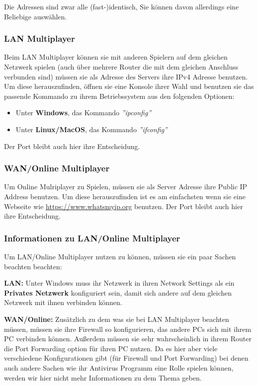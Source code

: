 \documentclass[fontsize=12pt,paper=a4,twoside]{scrartcl}
\begin{document}
Die Adressen sind zwar alle (fast-)identisch, Sie können davon allerdings eine Beliebige auswählen.

\subsubsection{LAN Multiplayer}

Beim LAN Multiplayer können sie mit anderen Spielern auf dem gleichen Netzwerk spielen (auch über mehrere Router die mit dem gleichen Anschluss verbunden sind) müssen sie als Adresse des Servers ihre IPv4 Adresse benutzen. Um diese herauszufinden, öffnen sie eine Konsole ihrer Wahl und benutzen sie das passende Kommando zu ihrem Betriebssystem aus den folgenden Optionen:

\begin{itemize}
\item Unter \textbf{Windows}, das Kommando \textit{''ipconfig''}
\item Unter \textbf{Linux/MacOS}, das Kommando \textit{''ifconfig''}
\end{itemize}

Der Port bleibt auch hier ihre Entscheidung.

\subsubsection{WAN/Online Multiplayer}

Um Online Mulriplayer zu Spielen, müssen sie als Server Adresse ihre Public IP Address benutzen. Um diese herauszufinden ist es am einfachsten wenn sie eine Webseite wie \url{https://www.whatsmyip.org} benutzen. Der Port bleibt auch hier ihre Entscheidung.

\subsubsection{Informationen zu LAN/Online Multiplayer}

Um LAN/Online Multiplayer nutzen zu können, müssen sie ein paar Sachen beachten beachten:

\textbf{LAN:} Unter Windows muss ihr Netzwerk in ihren Network Settings als ein \textbf{Privates Netzwerk} konfiguriert sein, damit sich andere auf dem gleichen Netzwerk mit ihnen verbinden können.

\textbf{WAN/Online:} Zusätzlich zu dem was sie bei LAN Multiplayer beachten müssen, müssen sie ihre Firewall so konfigurieren, das andere PCs sich mit ihrem PC verbinden können. Außerdem müssen sie sehr wahrscheinlich in ihrem Router die Port Forwarding option für ihren PC nutzen. Da es hier aber viele verschiedene Konfigurationen gibt (für Firewall und Port Forwarding) bei denen auch andere Sachen wie ihr Antivirus Programm eine Rolle spielen können, werden wir hier nicht mehr Informationen zu dem Thema geben.
\end{document}
